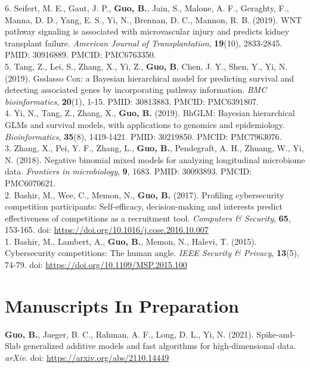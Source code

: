 6. Seifert, M. E., Gaut, J. P., {\bf Guo, B.}, Jain, S., Malone, A. F., Geraghty, F., Manna, D. D., Yang, E. S., Yi, N., Brennan, D. C., Mannon, R. B. (2019). WNT pathway signaling is associated with microvascular injury and predicts kidney transplant failure. {\it American Journal of Transplantation}, {\bf 19}(10), 2833-2845. PMID: 30916889. PMCID: PMC6763350. \\

5. Tang, Z., Lei, S., Zhang, X., Yi, Z.,  {\bf Guo, B}, Chen, J. Y., Shen, Y.,  Yi, N. (2019). Gsslasso Cox: a Bayesian hierarchical model for predicting survival and detecting associated genes by incorporating pathway information. {\it BMC bioinformatics}, {\bf 20}(1), 1-15. PMID: 30813883. PMCID: PMC6391807.\\

4. Yi, N., Tang, Z., Zhang, X., {\bf Guo, B.} (2019). BhGLM: Bayesian hierarchical GLMs and survival models, with applications to genomics and epidemiology. {\it Bioinformatics}, {\bf 35}(8), 1419-1421. PMID: 30219850. PMCID: PMC7963076.\\

3. Zhang, X., Pei, Y. F., Zhang, L., {\bf Guo, B.}, Pendegraft, A. H., Zhuang, W., Yi, N. (2018). Negative binomial mixed models for analyzing longitudinal microbiome data. {\it Frontiers in microbiology}, {\bf 9}, 1683. PMID: 30093893. PMCID: PMC6070621.\\

2. Bashir, M., Wee, C., Memon, N., {\bf Guo, B.} (2017). Profiling cybersecurity competition participants: Self-efficacy, decision-making and interests predict effectiveness of competitions as a recruitment tool. {\it Computers \& Security}, {\bf 65}, 153-165. doi: \url{https://doi.org/10.1016/j.cose.2016.10.007}\\

1. Bashir, M., Lambert, A., {\bf Guo, B.}, Memon, N., Halevi, T. (2015). Cybersecurity competitions: The human angle. {\it IEEE Security \& Privacy}, {\bf 13}(5), 74-79. doi: \url{https://doi.org/10.1109/MSP.2015.100}\\

\section{Manuscripts In Preparation}

\vspace{-3ex}

\textbf{Guo, B.}, Jaeger, B. C., Rahman, A. F., Long, D. L., Yi, N. (2021). Spike-and-Slab generalized additive models and fast algorithms for high-dimensional data. {\it arXiv}. doi: \url{https://arxiv.org/abs/2110.14449}\\

